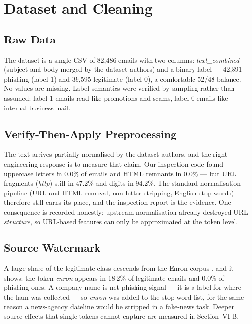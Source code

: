 \documentclass[conference]{IEEEtran}
\begin{document}
\section{Dataset and Cleaning}
\subsection{Raw Data}
The dataset is a single CSV of 82{,}486 emails with two columns:
\textit{text\_combined} (subject and body merged by the dataset authors)
and a binary label --- 42{,}891 phishing (label 1) and 39{,}595
legitimate (label 0), a comfortable 52/48 balance. No values are
missing. Label semantics were verified by sampling rather than assumed:
label-1 emails read like promotions and scams, label-0 emails like
internal business mail.

\subsection{Verify-Then-Apply Preprocessing}
The text arrives partially normalised by the dataset authors, and the
right engineering response is to measure that claim. Our inspection code
found uppercase letters in 0.0\% of emails and HTML remnants in 0.0\% ---
but URL fragments (\textit{http}) still in 47.2\% and digits in 94.2\%.
The standard normalisation pipeline (URL and HTML removal, non-letter
stripping, English stop words) therefore still earns its place, and the
inspection report is the evidence. One consequence is recorded honestly:
upstream normalisation already destroyed URL \textit{structure}, so
URL-based features can only be approximated at the token level.

\subsection{Source Watermark}
A large share of the legitimate class descends from the Enron corpus
\cite{klimt2004}, and it shows: the token \textit{enron} appears in
18.2\% of legitimate emails and 0.0\% of phishing ones. A company name
is not phishing signal --- it is a label for where the ham was collected
--- so \textit{enron} was added to the stop-word list, for the same
reason a news-agency dateline would be stripped in a fake-news task.
Deeper source effects that single tokens cannot capture are measured in
Section~VI-B.
\end{document}
